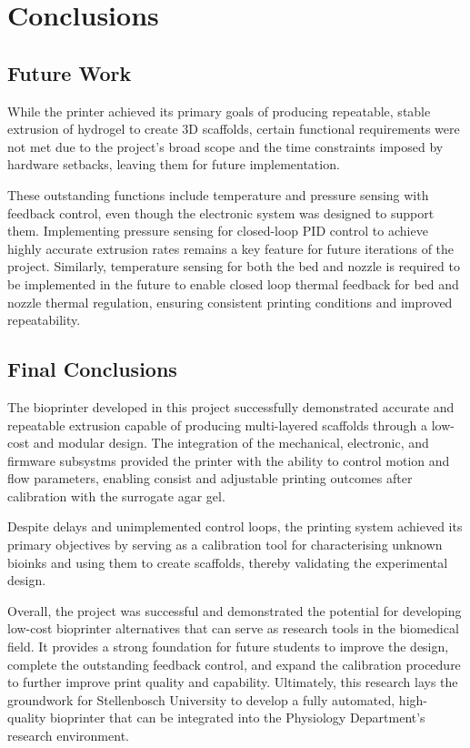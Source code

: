 \chapter{Conclusions}
\section{Future Work}
While the printer achieved its primary goals of producing repeatable, stable extrusion of hydrogel to create 3D scaffolds, certain functional requirements were not met due to the project's broad scope and the time constraints imposed by hardware setbacks, leaving them for future implementation.

These outstanding functions include temperature and pressure sensing with feedback control, even though the electronic system was designed to support them. Implementing pressure sensing for closed-loop PID control to achieve highly accurate extrusion rates remains a key feature for future iterations of the project. Similarly, temperature sensing for both the bed and nozzle is required to be implemented in the future to enable closed loop thermal feedback for bed and nozzle thermal regulation, ensuring consistent printing conditions and improved repeatability.

\section{Final Conclusions}
The bioprinter developed in this project successfully demonstrated accurate and repeatable extrusion capable of producing multi-layered scaffolds through a low-cost and modular design. The integration of the mechanical, electronic, and firmware subsystms provided the printer with the ability to control motion and flow parameters, enabling consist and adjustable printing outcomes after calibration with the surrogate agar gel.

Despite delays and unimplemented control loops, the printing system achieved its primary objectives by serving as a calibration tool for characterising unknown bioinks and using them to create scaffolds, thereby validating the experimental design.

Overall, the project was successful and demonstrated the potential for developing low-cost bioprinter alternatives that can serve as research tools in the biomedical field. It provides a strong foundation for future students to improve the design, complete the outstanding feedback control, and expand the calibration procedure to further improve print quality and capability. Ultimately, this research lays the groundwork for Stellenbosch University to develop a fully automated, high-quality bioprinter that can be integrated into the Physiology Department's research environment.